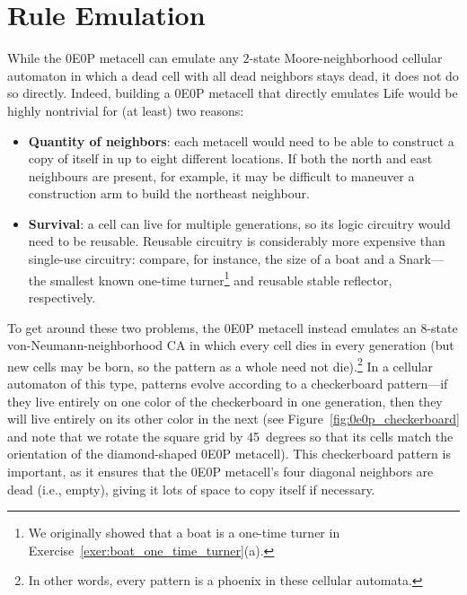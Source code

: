 \section{Rule Emulation}\label{sec:0e0p_rule_emulation}

While the 0E0P metacell can emulate any $2$-state Moore-neighborhood cellular automaton in which a dead cell with all dead neighbors stays dead, it does not do so directly. Indeed, building a 0E0P metacell that directly emulates Life would be highly nontrivial for (at least) two reasons:\smallskip

\begin{itemize}
	\item \textbf{Quantity of neighbors}: each metacell would need to be able to construct a copy of itself in up to eight different locations. If both the north and east neighbours are present, for example, it may be difficult to maneuver a construction arm to build the northeast neighbour.\smallskip
	
	\item \textbf{Survival}: a cell can live for multiple generations, so its logic circuitry would need to be reusable. Reusable circuitry is considerably more expensive than single-use circuitry: compare, for instance, the size of a boat and a Snark---the smallest known one-time turner\footnote{We originally showed that a boat is a one-time turner in Exercise~\ref{exer:boat_one_time_turner}(a).} and reusable stable reflector, respectively.\smallskip
\end{itemize}

To get around these two problems, the 0E0P metacell instead emulates an $8$-state von-Neumann-neighborhood CA in which every cell dies in every generation (but new cells may be born, so the pattern as a whole need not die).\footnote{In other words, every pattern is a phoenix in these cellular automata.} In a cellular automaton of this type, patterns evolve according to a checkerboard pattern---if they live entirely on one color of the checkerboard in one generation, then they will live entirely on its other color in the next (see Figure~\ref{fig:0e0p_checkerboard} and note that we rotate the square grid by 45~degrees so that its cells match the orientation of the diamond-shaped 0E0P metacell). This checkerboard pattern is important, as it ensures that the 0E0P metacell's four diagonal neighbors are dead (i.e., empty), giving it lots of space to copy itself if necessary.


